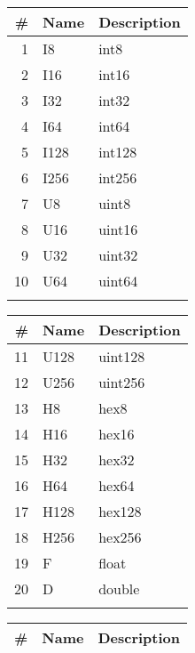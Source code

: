 \documentclass[documentation]{subfiles}
\begin{document}
\begin{savenotes}
\begin{minipage}{.28\textwidth}
    \begin{longtable}{rll}
        \toprule
        {\bf \#} & {\bf Name} & {\bf Description}\\
        \midrule\endhead%
         1 & I8   & int8\\
         2 & I16  & int16\\
         3 & I32  & int32\\
         4 & I64  & int64\\
         5 & I128 & int128\\
         6 & I256 & int256\\
         7 & U8   & uint8\\
         8 & U16  & uint16\\
         9 & U32  & uint32\\
        10 & U64  & uint64\\\\
        \bottomrule
    \end{longtable}
\end{minipage}
\begin{minipage}{.28\textwidth}
    \begin{longtable}{rll}
        \toprule
        {\bf \#} & {\bf Name} & {\bf Description}\\
        \midrule\endhead%
        11 & U128 & uint128\\
        12 & U256 & uint256\\
        13 & H8   & hex8\\
        14 & H16  & hex16\\
        15 & H32  & hex32\\
        16 & H64  & hex64\\
        17 & H128 & hex128\\
        18 & H256 & hex256\\
        19 & F    & float\\
        20 & D    & double\\\\
        \bottomrule
    \end{longtable}
\end{minipage}
\begin{minipage}{.4\textwidth}
    \begin{longtable}{rll}
        \toprule
        {\bf \#} & {\bf Name} & {\bf Description}\\
        \midrule\endhead%

\end{longtable}
\end{minipage}
\end{savenotes}
\end{document}
